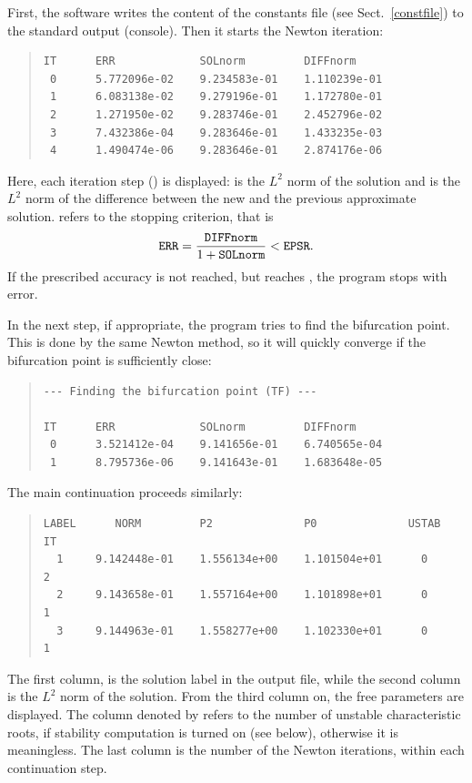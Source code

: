 \documentclass[10pt,a4paper]{ddedoc}
\begin{document}
First, the software writes the content of the constants file (see Sect.\
\ref{constfile}) to the standard output (console). Then it starts the Newton
iteration:
{ \small \begin{quote} \begin{lstlisting}[basicstyle=\tt,frame=single]
IT      ERR             SOLnorm         DIFFnorm
 0      5.772096e-02    9.234583e-01    1.110239e-01
 1      6.083138e-02    9.279196e-01    1.172780e-01
 2      1.271950e-02    9.283746e-01    2.452796e-02
 3      7.432386e-04    9.283646e-01    1.433235e-03
 4      1.490474e-06    9.283646e-01    2.874176e-06
\end{lstlisting} \end{quote} } \noindent
Here, each iteration step () is displayed:  is the $L^2$
norm of the solution and \funp{DIFFnorm} is the $L^2$ norm of the difference
between the new and the previous approximate solution. \funp{ERR} refers to the
stopping criterion, that is
\[
	{\tt ERR} = \frac{{\tt DIFFnorm}}{1+{\tt SOLnorm}} < {\tt EPSR}.
\]
If the prescribed accuracy is not reached, but  reaches ,
the program stops with error.

In the next step, if appropriate, the program tries to find the bifurcation
point. This is done by the same Newton method, so it will quickly converge if
the bifurcation point is sufficiently close:
{ \small \begin{quote} \begin{lstlisting}[basicstyle=\tt,frame=single]
--- Finding the bifurcation point (TF) ---

IT      ERR             SOLnorm         DIFFnorm
 0      3.521412e-04    9.141656e-01    6.740565e-04
 1      8.795736e-06    9.141643e-01    1.683648e-05
\end{lstlisting} \end{quote} } \noindent

The main continuation proceeds similarly:
{ \small \begin{quote} \begin{lstlisting}[basicstyle=\tt,frame=single]
LABEL      NORM         P2              P0              USTAB   IT
  1     9.142448e-01    1.556134e+00    1.101504e+01      0     2
  2     9.143658e-01    1.557164e+00    1.101898e+01      0     1
  3     9.144963e-01    1.558277e+00    1.102330e+01      0     1
\end{lstlisting} \end{quote} } \noindent
The first column,  is the solution label in the output file, while
the second column is the $L^2$ norm of the solution. From the third column on,
the free parameters are displayed. The column denoted by \funp{USTAB} refers to
the number of unstable characteristic roots, if stability computation is turned
on (see \funp{STAB} below), otherwise it is meaningless. The last column is the
number of the Newton iterations, within each continuation step.
\end{document}
